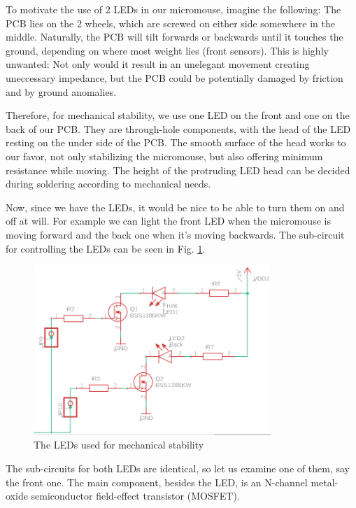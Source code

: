 To motivate the use of 2 LEDs in our micromouse, imagine the following: The PCB lies on the 2 wheels, which are screwed on either side somewhere in the middle. Naturally, the PCB will tilt forwards or backwards until it touches the ground, depending on where most weight lies (front sensors). This is highly unwanted: Not only would it result in an unelegant movement creating uneccessary impedance, but the PCB could be potentially damaged by friction and by ground anomalies.

Therefore, for mechanical stability, we use one LED on the front and one on the back of our PCB. They are through-hole components, with the head of the LED resting on the under side of the PCB. The smooth surface of the head works to our favor, not only stabilizing the micromouse, but also offering minimum resistance while moving. The height of the protruding LED head can be decided during soldering according to mechanical needs.

Now, since we have the LEDs, it would be nice to be able to turn them on and off at will. For example we can light the front LED when the micromouse is moving forward and the back one when it's moving backwards.
The sub-circuit for controlling the LEDs can be seen in Fig. \ref{fig:leds}.

\begin{figure}[htb]
    \centering
    \includegraphics[width=0.8\textwidth]{figures/hardware/LEDs.PNG}
    \caption{The LEDs used for mechanical stability}
    \label{fig:leds}
\end{figure}
\FloatBarrier

The sub-circuits for both LEDs are identical, so let us examine one of them, say the front one. The main component, besides the LED, is an N-channel metal-oxide semiconductor field-effect transistor (MOSFET).


